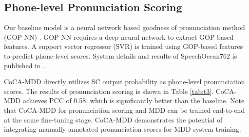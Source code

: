 \documentclass[a4paper]{article}
\begin{document}
\subsection{Phone-level Pronunciation Scoring}
Our baseline model is a neural network based goodness of pronunciation method (GOP-NN) \cite{HU2015154}. GOP-NN requires a deep neural network to extract GOP-based features. A support vector regressor (SVR) is trained using GOP-based features to predict phone-level scores. System details and results of SpeechOcean762 is published in \cite{zhang2021speechocean762}.

CoCA-MDD directly utilizes SC output probability as phone-level pronunciation scores. The results of pronunciation scoring is shown in Table \ref{tab:t3}. CoCA-MDD achieves PCC of 0.58, which is significantly better than the baseline. Note that CoCA-MDD for pronunciation scoring and MDD can be trained end-to-end at the same fine-tuning stage. CoCA-MDD demonstrates the potential of integrating manually annotated pronunciation scores for MDD system training.
\end{document}
